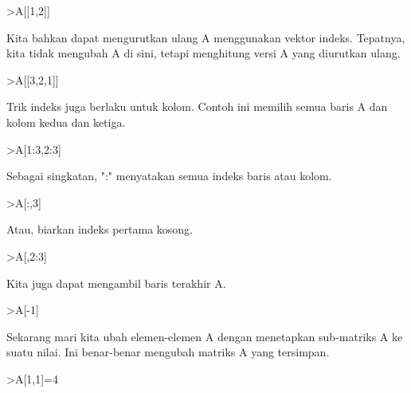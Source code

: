 \documentclass[a4paper,10pt]{article}
\begin{document}
\begin{eulernotebook}
\begin{euleroutput}
\end{euleroutput}
\begin{eulerprompt}
>A[[1,2]]
\end{eulerprompt}
\begin{euleroutput}
  
  Kita bahkan dapat mengurutkan ulang A menggunakan vektor indeks. Tepatnya, kita tidak mengubah A di sini, tetapi menghitung versi A yang diurutkan ulang.
  
\end{euleroutput}
\begin{eulerprompt}
>A[[3,2,1]]
\end{eulerprompt}
\begin{euleroutput}
  
  Trik indeks juga berlaku untuk kolom. Contoh ini memilih semua baris A dan kolom kedua dan ketiga.
  
\end{euleroutput}
\begin{eulerprompt}
>A[1:3,2:3]
\end{eulerprompt}
\begin{euleroutput}
  
  Sebagai singkatan, ":" menyatakan semua indeks baris atau kolom.
  
\end{euleroutput}
\begin{eulerprompt}
>A[:,3]
\end{eulerprompt}
\begin{euleroutput}
  
  Atau, biarkan indeks pertama kosong.
  
\end{euleroutput}
\begin{eulerprompt}
>A[,2:3]
\end{eulerprompt}
\begin{euleroutput}
  
  Kita juga dapat mengambil baris terakhir A.
  
\end{euleroutput}
\begin{eulerprompt}
>A[-1]
\end{eulerprompt}
\begin{euleroutput}
  
  Sekarang mari kita ubah elemen-elemen A dengan menetapkan sub-matriks A ke suatu nilai. Ini benar-benar mengubah matriks A yang tersimpan.
  
\end{euleroutput}
\begin{eulerprompt}
>A[1,1]=4
\end{eulerprompt}
\begin{euleroutput}
  

\end{euleroutput}
\end{eulernotebook}
\end{document}
